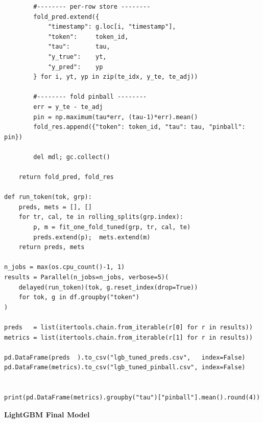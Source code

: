 \documentclass[
  a4paper,
  DIV=11,
  numbers=noendperiod]{scrreprt}
\begin{document}
\begin{verbatim}
        #-------- per-row store --------
        fold_pred.extend({
            "timestamp": g.loc[i, "timestamp"],
            "token":     token_id,
            "tau":       tau,
            "y_true":    yt,
            "y_pred":    yp
        } for i, yt, yp in zip(te_idx, y_te, te_adj))

        #-------- fold pinball --------
        err = y_te - te_adj
        pin = np.maximum(tau*err, (tau-1)*err).mean()
        fold_res.append({"token": token_id, "tau": tau, "pinball": pin})

        del mdl; gc.collect()

    return fold_pred, fold_res

def run_token(tok, grp):
    preds, mets = [], []
    for tr, cal, te in rolling_splits(grp.index):
        p, m = fit_one_fold_tuned(grp, tr, cal, te)
        preds.extend(p);  mets.extend(m)
    return preds, mets

n_jobs = max(os.cpu_count()-1, 1)
results = Parallel(n_jobs=n_jobs, verbose=5)(
    delayed(run_token)(tok, g.reset_index(drop=True))
    for tok, g in df.groupby("token")
)

preds   = list(itertools.chain.from_iterable(r[0] for r in results))
metrics = list(itertools.chain.from_iterable(r[1] for r in results))

pd.DataFrame(preds  ).to_csv("lgb_tuned_preds.csv",   index=False)
pd.DataFrame(metrics).to_csv("lgb_tuned_pinball.csv", index=False)


print(pd.DataFrame(metrics).groupby("tau")["pinball"].mean().round(4))
\end{verbatim}

\textbf{LightGBM Final Model}
\end{document}
